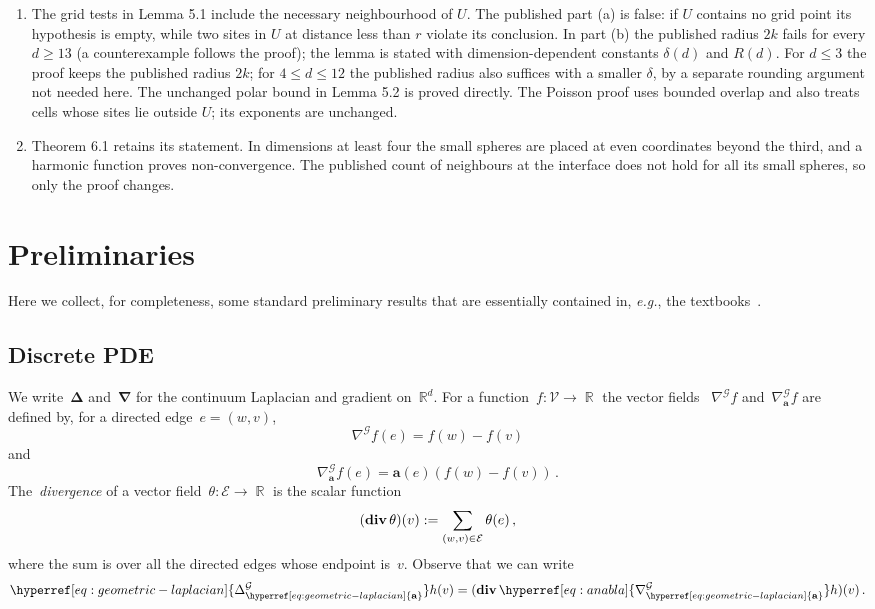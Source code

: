\documentclass[12pt]{amsart}
\numberwithin{equation}{section}
\DeclareMathOperator{\R}{\mathbb{R}}
\newcommand{\eg}{{\it e.g.}}
\renewcommand{\div}{\mathop{\bf div}}
\newcommand*{\Rd}{\ensuremath{\mathbb{R}^d}}
\newcommand{\V}{\mathcal{V}}
\newcommand{\E}{\mathcal{E}}
\newcommand{\CLap}{\boldsymbol{\Delta}}
\newcommand{\Cnabla}{\boldsymbol{\nabla}}
\newcommand{\aDelta}{\hyperref[eq:geometric-laplacian]{{\Delta^{\mathcal{G}}_{\cond}}}}
\newcommand{\cond}{\hyperref[eq:geometric-laplacian]{\mathbf{a}}}
\newcommand{\anabla}{\hyperref[eq:anabla]{{\nabla^{\mathcal{G}}_{\cond}}}}
\begin{document}
\begin{enumerate}
\item The grid tests in Lemma 5.1 include the necessary neighbourhood of $U$. The published part (a) is false: if $U$ contains no grid point its hypothesis is empty, while two sites in $U$ at distance less than $r$ violate its conclusion. In part (b) the published radius $2k$ fails for every $d\ge13$ (a counterexample follows the proof); the lemma is stated with dimension-dependent constants $\delta(d)$ and $R(d)$. For $d\le3$ the proof keeps the published radius $2k$; for $4\le d\le12$ the published radius also suffices with a smaller $\delta$, by a separate rounding argument not needed here. The unchanged polar bound in Lemma 5.2 is proved directly. The Poisson proof uses bounded overlap and also treats cells whose sites lie outside $U$; its exponents are unchanged.
\item Theorem 6.1 retains its statement. In dimensions at least four the small spheres are placed at even coordinates beyond the third, and a harmonic function proves non-convergence. The published count of neighbours at the interface does not hold for all its small spheres, so only the proof changes.
\end{enumerate}

\section{Preliminaries}
\label{sec:prelims}
Here we collect, for completeness, some standard preliminary results that are essentially contained in, \eg, the textbooks~\cite{eymard2000finite, Telcs2006, droniou2018gradient}.


\subsection{Discrete PDE}
We write~$\CLap$ and~$\Cnabla$ for the continuum Laplacian and gradient on~$\Rd$. For a function~$f : \V \to \R$ the vector fields
~$\nabla^{\mathcal{G}} f$ and~$\anabla f$ are defined by,  for a directed edge~$e = (w,v)$, 
\begin{equation}
	\nabla^{\mathcal{G}} f(e) = f(w) - f(v)	
\end{equation}
and
\begin{equation}
	\label{eq:anabla}
\anabla f(e) = \cond(e)(f(w) - f(v)) \, . 
\end{equation}
 The~\emph{divergence} of a vector field~$\theta:\E \to \R$ is the scalar function 
\begin{equation}
	\label{eq:discrete-divergence}
(\div \theta)(v) := \sum_{ (w,v) \in \E } \theta(e) \, , 
\end{equation}
where the sum is over all the directed edges whose endpoint is~$v$. Observe that we can write 
\[
\aDelta h(v) = (\div \anabla h)(v) \, .  
\]
\end{document}
